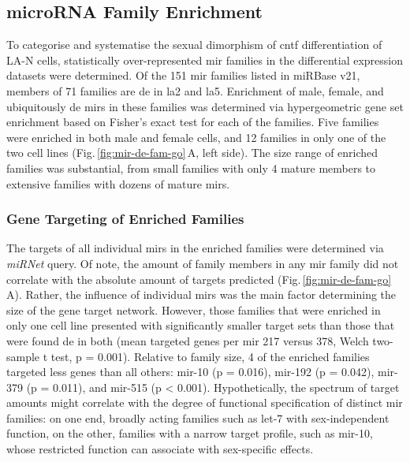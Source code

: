 \subsection{microRNA Family Enrichment}
To categorise and systematise the sexual dimorphism of \ac{cntf} differentiation of LA-N cells, statistically over-represented \ac{mir} families in the differential expression datasets were determined. Of the 151 \ac{mir} families listed in miRBase v21, members of 71 families are \ac{de} in \ac{la2} and \ac{la5}. Enrichment of male, female, and ubiquitously \ac{de} \acp{mir} in these families was determined via hypergeometric gene set enrichment based on Fisher's exact test for each of the families. Five families were enriched in both male and female cells, and 12 families in only one of the two cell lines (Fig.\,\ref{fig:mir-de-fam-go}\,A, left side). The size range of enriched families was substantial, from small families with only 4 mature members to extensive families with dozens of mature \acp{mir}. 

\subsubsection{Gene Targeting of Enriched Families}
The targets of all individual \acp{mir} in the enriched families were determined via \textit{miRNet} query. Of note, the amount of family members in any \ac{mir} family did not correlate with the absolute amount of targets predicted (Fig.\,\ref{fig:mir-de-fam-go}\,A). Rather, the influence of individual \acp{mir} was the main factor determining the size of the gene target network. However, those families that were enriched in only one cell line presented with significantly smaller target sets than those that were found \ac{de} in both (mean targeted genes per \ac{mir} 217 versus 378, Welch two-sample t test, p = 0.001). Relative to family size, 4 of the enriched families targeted less genes than all others: mir-10 (p = 0.016), mir-192 (p = 0.042), mir-379 (p = 0.011), and mir-515 (p < 0.001). Hypothetically, the spectrum of target amounts might correlate with the degree of functional specification of distinct \ac{mir} families: on one end, broadly acting families such as let-7 with sex-independent function, on the other, families with a narrow target profile, such as mir-10, whose restricted function can associate with sex-specific effects.

